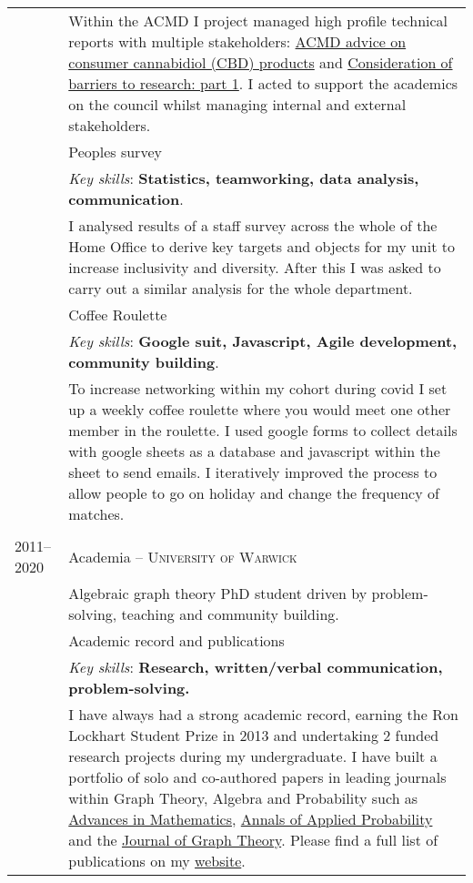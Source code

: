 \documentclass[a4paper,10pt]{article}
\newcommand{\tab}{\hspace{10 pt}}
\begin{document}
\begin{tabular}{p{2.25cm}|p{15cm}}
&	\footnotesize{Within the ACMD I project managed high profile technical reports with multiple stakeholders: \href{https://www.gov.uk/government/publications/acmd-advice-on-consumer-cannabidiol-cbd-products}{ACMD advice on consumer cannabidiol (CBD) products} and \href{https://www.gov.uk/government/publications/consideration-of-barriers-to-research-part-1}{Consideration of barriers to research: part 1}. I acted to support the academics on the council whilst managing internal and external stakeholders.}\vspace{0.05 in}\\
	 & \tab Peoples survey\\
	 & \footnotesize{\emph{Key skills}: \textbf{Statistics, teamworking, data analysis, communication}.}\\
	 &	\footnotesize{I analysed results of a staff survey across the whole of the Home Office to derive key targets and objects for my unit to increase inclusivity and diversity. After this I was asked to carry out a similar analysis for the whole department.}\vspace{0.05 in}\\	
	 & \tab Coffee Roulette\\
	 & \footnotesize{\emph{Key skills}: \textbf{Google suit, Javascript, Agile development, community building}.}\\
	 &	\footnotesize{To increase networking within my cohort during covid I set up a weekly coffee roulette where you would meet one other member in the roulette. I used google forms to collect details with google sheets as a database and javascript within the sheet to send emails. I iteratively improved the process to allow people to go on holiday and change the frequency of matches.}\\
\multicolumn{2}{c}{} \\
%
%
	\textsc{2011--2020} & Academia -- \textsc{University of Warwick}\\
	 & \footnotesize{Algebraic graph theory PhD student driven by problem-solving, teaching and community building.}\\
	 & \tab Academic record and publications\\
	 & \footnotesize{\emph{Key skills}: \textbf{Research, written/verbal communication, problem-solving.}}\\
	 &	\footnotesize{I have always had a strong academic record, earning the Ron Lockhart Student Prize in 2013 and undertaking 2 funded research projects during my undergraduate. I have built a portfolio of solo and co-authored papers in leading journals within Graph Theory, Algebra and Probability such as \href{https://www.sciencedirect.com/science/article/pii/S0001870818303347}{Advances in Mathematics}, \href{https://imstat.org/journals-and-publications/annals-of-applied-probability/}{Annals of Applied Probability} and the \href{http://onlinelibrary.wiley.com/doi/10.1002/jgt.22002/abstract}{Journal of Graph Theory}. Please find a full list of publications on my \href{https://warwick.ac.uk/fac/sci/maths/people/staff/wendland/}{website}.}\vspace{0.05 in}\\	

\end{tabular}
\end{document}
